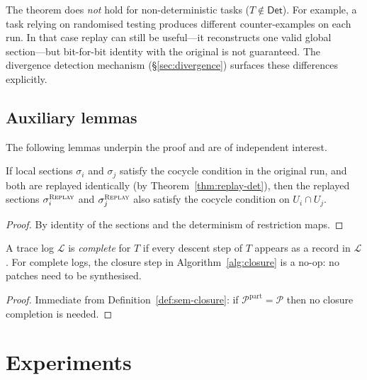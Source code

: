\documentclass[11pt]{article}
\newcommand{\Replay}{\textsc{Replay}}
\newcommand{\TraceLog}{\mathcal{L}}
\newcommand{\PatchSet}{\mathcal{P}}
\newcommand{\GS}{\sigma}                   %
\newcommand{\DetProg}{\mathsf{Det}}
\begin{document}
\begin{remark}
The theorem does \emph{not} hold for non-deterministic tasks
($T \notin \DetProg$).  For example, a task relying on
randomised testing produces different counter-examples on each run.
In that case replay can still be useful—it reconstructs one valid
global section—but bit-for-bit identity with the original is not
guaranteed.  The divergence detection mechanism
(\S\ref{sec:divergence}) surfaces these differences explicitly.
\end{remark}

\subsection{Auxiliary lemmas}

The following lemmas underpin the proof and are of independent interest.

\begin{lemma}
\label{lem:overlap-pres}
If local sections $\GS_i$ and $\GS_j$ satisfy the cocycle condition in
the original run, and both are replayed identically (by
Theorem~\ref{thm:replay-det}), then the replayed sections
$\GS^{\Replay}_i$ and $\GS^{\Replay}_j$ also satisfy the cocycle
condition on $U_i \cap U_j$.
\end{lemma}

\begin{proof}
By identity of the sections and the determinism of restriction maps.
\end{proof}

\begin{lemma}
\label{lem:log-complete}
A trace log $\TraceLog$ is \emph{complete} for $T$ if every descent
step of $T$ appears as a record in $\TraceLog$.  For complete logs,
the closure step in Algorithm~\ref{alg:closure} is a no-op: no patches
need to be synthesised.
\end{lemma}

\begin{proof}
Immediate from Definition~\ref{def:sem-closure}: if
$\PatchSet^{\mathrm{part}} = \PatchSet$ then no closure completion is
needed.
\end{proof}


\section{Experiments}
\label{sec:experiments}
\end{document}
